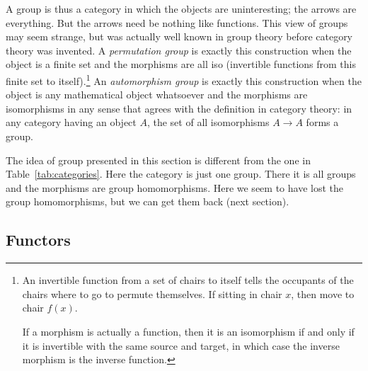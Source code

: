 \documentclass[11pt]{article}
\begin{document}
A group is thus a category in which the objects are uninteresting;
the arrows are everything.  But the arrows need be nothing like functions.
This view of groups may seem strange, but was actually well known in
group theory before category theory was invented.
A \emph{permutation group} is exactly this construction when the object
is a finite set and the morphisms are all iso (invertible functions
from this finite set to itself).\footnote{An invertible function from
a set of chairs to itself tells the occupants of the chairs where to
go to permute themselves.  If sitting in chair $x$, then move to chair $f(x)$.

If a morphism is actually a function, then it is an isomorphism if and only
if it is invertible with the same source and target,
in which case the inverse morphism is the inverse function.}
An \emph{automorphism group} is exactly this construction when the object
is any mathematical object whatsoever and the morphisms are isomorphisms
in any sense that agrees with the definition in category theory:
in any category having an object $A$, the set of all isomorphisms $A \to A$
forms a group.

The idea of group presented in this section is different from the one
in Table~\ref{tab:categories}.  Here the category is just one group.
There it is all groups and the morphisms are group homomorphisms.
Here we seem to have lost the group homomorphisms, but we can get them
back (next section).

\subsection{Functors}
\end{document}
